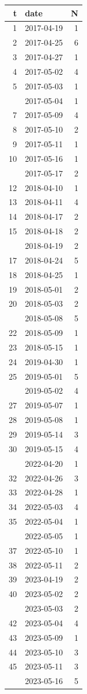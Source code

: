 \documentclass[
]{article}
\begin{document}
\begin{longtable}{rlr}
\toprule
t & date & N\\
\midrule
1 & 2017-04-19 & 1\\
2 & 2017-04-25 & 6\\
3 & 2017-04-27 & 1\\
4 & 2017-05-02 & 4\\
5 & 2017-05-03 & 1\\
\addlinespace
6 & 2017-05-04 & 1\\
7 & 2017-05-09 & 4\\
8 & 2017-05-10 & 2\\
9 & 2017-05-11 & 1\\
10 & 2017-05-16 & 1\\
\addlinespace
11 & 2017-05-17 & 2\\
12 & 2018-04-10 & 1\\
13 & 2018-04-11 & 4\\
14 & 2018-04-17 & 2\\
15 & 2018-04-18 & 2\\
\addlinespace
16 & 2018-04-19 & 2\\
17 & 2018-04-24 & 5\\
18 & 2018-04-25 & 1\\
19 & 2018-05-01 & 2\\
20 & 2018-05-03 & 2\\
\addlinespace
21 & 2018-05-08 & 5\\
22 & 2018-05-09 & 1\\
23 & 2018-05-15 & 1\\
24 & 2019-04-30 & 1\\
25 & 2019-05-01 & 5\\
\addlinespace
26 & 2019-05-02 & 4\\
27 & 2019-05-07 & 1\\
28 & 2019-05-08 & 1\\
29 & 2019-05-14 & 3\\
30 & 2019-05-15 & 4\\
\addlinespace
31 & 2022-04-20 & 1\\
32 & 2022-04-26 & 3\\
33 & 2022-04-28 & 1\\
34 & 2022-05-03 & 4\\
35 & 2022-05-04 & 1\\
\addlinespace
36 & 2022-05-05 & 1\\
37 & 2022-05-10 & 1\\
38 & 2022-05-11 & 2\\
39 & 2023-04-19 & 2\\
40 & 2023-05-02 & 2\\
\addlinespace
41 & 2023-05-03 & 2\\
42 & 2023-05-04 & 4\\
43 & 2023-05-09 & 1\\
44 & 2023-05-10 & 3\\
45 & 2023-05-11 & 3\\
\addlinespace
46 & 2023-05-16 & 5\\
\bottomrule
\end{longtable}
\end{document}
